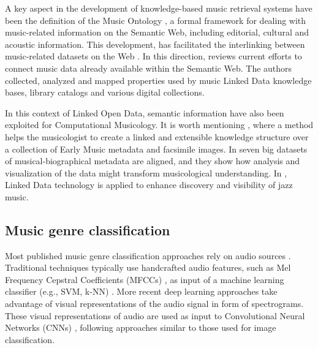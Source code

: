 A key aspect in the development of knowledge-based music retrieval systems have been the definition of the Music Ontology \cite{raimond2007music}, a formal framework for dealing with music-related information on the Semantic Web, including editorial, cultural and acoustic information. This development, has facilitated the interlinking between music-related datasets on the Web \cite{raimond2008automatic}. In this direction, \cite{Gracy2013} reviews current efforts to connect music data already available within the Semantic Web. The authors collected, analyzed and mapped properties used by music Linked Data knowledge bases, library catalogs and various digital collections.

In this context of Linked Open Data, semantic information have also been exploited for Computational Musicology. It is worth mentioning \cite{Crawford}, where a method helps the musicologist to create a linked and extensible knowledge structure over a collection of Early Music metadata and facsimile images.  
In \cite{Rose2014} seven big datasets of musical-biographical metadata are aligned, and they show how analysis and visualization of the data might transform musicological understanding. In \cite{Pattuelli2013}, Linked Data technology is applied to enhance discovery and visibility of jazz music.


\subsection{Music genre classification}
\label{sec:SOA:mir:classfication}


Most published music genre classification approaches rely on audio sources \citep{sturm2012survey,bogdanov2016cross}. 
Traditional techniques typically use handcrafted audio features, such as Mel Frequency Cepstral Coefficients (MFCCs) \citep{logan2000mel}, as input of a machine learning classifier (e.g., SVM, k-NN) \citep{Tzanetakis2002,seyerlehner2010using}.
More recent deep learning approaches take advantage of visual representations of the audio signal in form of spectrograms.
These visual representations of audio are used as input to Convolutional Neural Networks (CNNs) \citep{dieleman2011audio,dieleman2014end,pons2016experimenting,Choi2016,choi2016convolutional}, following approaches similar to those used for image classification.

